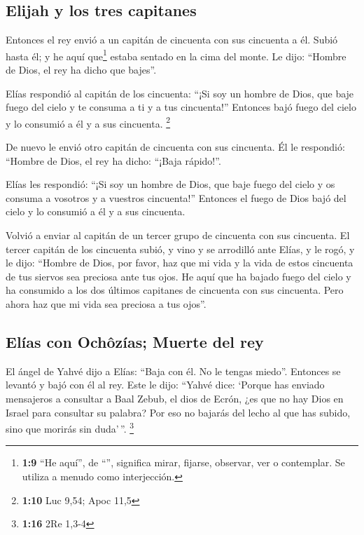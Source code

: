 \hypertarget{elijah-y-los-tres-capitanes}{%
\subsection{Elijah y los tres
capitanes}\label{elijah-y-los-tres-capitanes}}

 Entonces el rey envió a un capitán de cincuenta con sus
cincuenta a él. Subió hasta él; y he aquí que\footnote{\textbf{1:9} ``He
  aquí'', de ``'', significa mirar, fijarse, observar, ver o
  contemplar. Se utiliza a menudo como interjección.} estaba sentado en
la cima del monte. Le dijo: ``Hombre de Dios, el rey ha dicho que
bajes''.

 Elías respondió al capitán de los cincuenta: ``¡Si soy
un hombre de Dios, que baje fuego del cielo y te consuma a ti y a tus
cincuenta!'' Entonces bajó fuego del cielo y lo consumió a él y a sus
cincuenta. \footnote{\textbf{1:10} Luc 9,54; Apoc 11,5}

 De nuevo le envió otro capitán de cincuenta con sus
cincuenta. Él le respondió: ``Hombre de Dios, el rey ha dicho: ``¡Baja
rápido!''.

 Elías les respondió: ``¡Si soy un hombre de Dios, que
baje fuego del cielo y os consuma a vosotros y a vuestros cincuenta!''
Entonces el fuego de Dios bajó del cielo y lo consumió a él y a sus
cincuenta.

 Volvió a enviar al capitán de un tercer grupo de
cincuenta con sus cincuenta. El tercer capitán de los cincuenta subió, y
vino y se arrodilló ante Elías, y le rogó, y le dijo: ``Hombre de Dios,
por favor, haz que mi vida y la vida de estos cincuenta de tus siervos
sea preciosa ante tus ojos.  He aquí que ha bajado fuego
del cielo y ha consumido a los dos últimos capitanes de cincuenta con
sus cincuenta. Pero ahora haz que mi vida sea preciosa a tus ojos''.

\hypertarget{eluxedas-con-ochuxf4zuxedas-muerte-del-rey}{%
\subsection{Elías con Ochôzías; Muerte del
rey}\label{eluxedas-con-ochuxf4zuxedas-muerte-del-rey}}

 El ángel de Yahvé dijo a Elías: ``Baja con él. No le
tengas miedo''. Entonces se levantó y bajó con él al rey.
 Este le dijo: ``Yahvé dice: `Porque has enviado
mensajeros a consultar a Baal Zebub, el dios de Ecrón, ¿es que no hay
Dios en Israel para consultar su palabra? Por eso no bajarás del lecho
al que has subido, sino que morirás sin duda'\,''. \footnote{\textbf{1:16}
  2Re 1,3-4}

